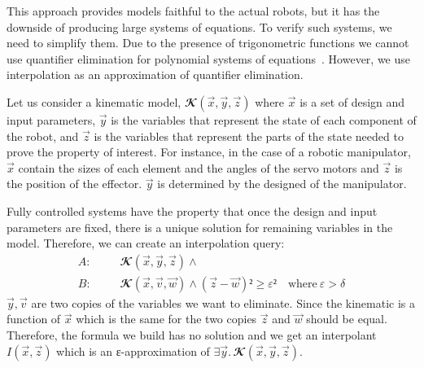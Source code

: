 This approach provides models faithful to the actual robots, but it has the downside of producing large systems of equations.
To verify such systems, we need to simplify them.
Due to the presence of trigonometric functions we cannot use quantifier elimination for polynomial systems of equations~\cite{qepcad}.
However, we use interpolation as an approximation of quantifier elimination.

Let us consider a kinematic model, $𝓚(\vec x,\vec y,\vec z)$ where $\vec x$ is a set of design and input parameters, $\vec y$ is the variables that represent the state of each component of the robot, and $\vec z$ is the variables that represent the parts of the state needed to prove the property of interest.
For instance, in the case of a robotic manipulator, $\vec x$ contain the sizes of each element and the angles of the servo motors and $\vec z$ is the position of the effector.
$\vec y$ is determined by the designed of the manipulator.

Fully controlled systems have the property that once the design and input parameters are fixed, there is a unique solution for remaining variables in the model.
Therefore, we can create an interpolation query:
\begin{eqnarray*}
A: &~~~~ &  𝓚(\vec x,\vec y,\vec z) ∧ \\
B: &~~~~ &  𝓚(\vec x,\vec v,\vec w) ∧ (\vec z-\vec w)² ≥ ε² \quad \text{where} ~ ε > δ
\end{eqnarray*}
$\vec y, \vec v$ are two copies of the variables we want to eliminate.
Since the kinematic is a function of $\vec x$ which is the same for the two copies $\vec z$ and $\vec w$ should be equal.
Therefore, the formula we build has no solution and we get an interpolant $I(\vec x,\vec z)$ which is an ε-approximation of $∃ \vec y.\,𝓚(\vec x,\vec y,\vec z)$.

